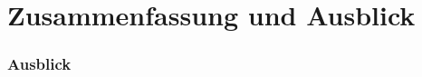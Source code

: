 \chapter{Zusammenfassung und Ausblick}
\label{chap:ergebnisse}

\subsection*{Ausblick}







\newpage

